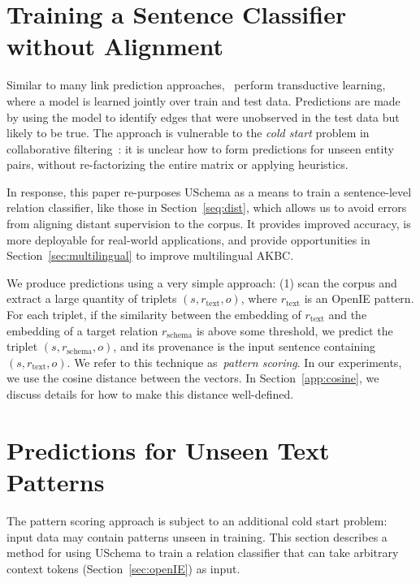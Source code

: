\section{Training a Sentence Classifier without Alignment}
\label{sec:uschema}
Similar to many link prediction approaches,~\citep{limin} perform transductive learning, where a model is learned jointly over train and test data. Predictions are made by using the model to identify edges that were unobserved in the test data but likely to be true. The approach is vulnerable to the \emph{cold start} problem in collaborative filtering~\citep{schein2002methods}: it is unclear how to form predictions for unseen entity pairs, without re-factorizing the entire matrix or applying heuristics. 

In response, this paper re-purposes USchema as a means to train a sentence-level relation classifier, like those in Section~\ref{seq:dist}, which allows us to avoid errors from aligning distant supervision to the corpus. It provides improved accuracy, is more deployable for real-world applications, and provide opportunities in Section~\ref{sec:multilingual} to improve multilingual AKBC.

We produce predictions using a very simple approach: (1) scan the corpus and extract a large quantity of triplets $(s,r_{\text{text}},o)$, where $r_{\text{text}}$ is an OpenIE pattern. For each triplet, if the similarity between the embedding of $r_{\text{text}}$ and the embedding of a target relation $r_{\text{schema}}$ is above some threshold, we predict the triplet $(s,r_{\text{schema}},o)$, and its provenance is the input sentence containing $(s,r_{\text{text}},o)$. We refer to this technique as~\textit{pattern scoring}. In our experiments, we use the cosine distance between the vectors. In Section~\ref{app:cosine}, we discuss details for how to make this distance well-defined. 

\section{Predictions for Unseen Text Patterns \label{sec:encoder}}
The pattern scoring approach is subject to an additional cold start problem: input data may contain patterns unseen in training. This section describes a method for using USchema to train a relation classifier that can take arbitrary context tokens (Section~\ref{sec:openIE}) as input. 

